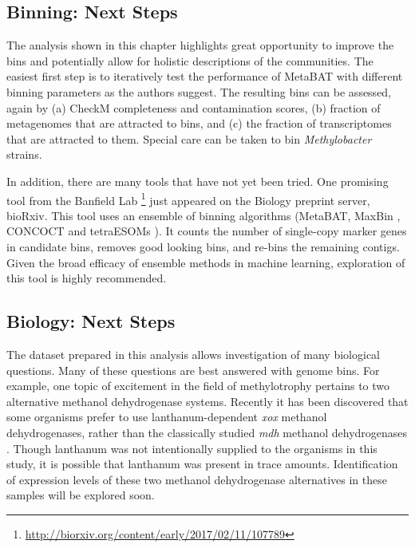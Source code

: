 
\subsection{Binning: Next Steps}

The analysis shown in this chapter highlights great opportunity to improve the bins and potentially allow for holistic descriptions of the communities.
The easiest first step is to iteratively test the performance of MetaBAT with different binning parameters as the authors suggest.
The resulting bins can be assessed, again by (a) CheckM completeness and contamination scores, (b) fraction of metagenomes that are attracted to bins, and (c) the fraction of transcriptomes that are attracted to them.
Special care can be taken to bin \textit{Methylobacter} strains.

In addition, there are many tools that have not yet been tried.
One promising tool from the Banfield Lab \cite{sieber2017}\footnote{\url{http://biorxiv.org/content/early/2017/02/11/107789}} just appeared on the Biology preprint server, bioRxiv.
This tool uses an ensemble of binning algorithms (MetaBAT\cite{metabat2015}, MaxBin \cite{wu2015}, CONCOCT \cite{concoct2014} and tetraESOMs \cite{dick2009}).
It counts the number of single-copy marker genes in candidate bins, removes good looking bins, and re-bins the remaining contigs.
Given the broad efficacy of ensemble methods in machine learning, exploration of this tool is highly recommended.



\subsection{Biology: Next Steps}

The dataset prepared in this analysis allows investigation of many biological questions.
Many of these questions are best answered with genome bins.
For example, one topic of excitement in the field of methylotrophy pertains to two alternative methanol dehydrogenase systems.
Recently it has been discovered that some organisms prefer to use lanthanum-dependent \textit{xox} methanol dehydrogenases, rather than the classically studied \textit{mdh} methanol dehydrogenases \cite{chu2016}.
Though lanthanum was not intentionally supplied to the organisms in this study, it is possible that lanthanum was present in trace amounts.
Identification of expression levels of these two methanol dehydrogenase alternatives in these samples will be explored soon.


